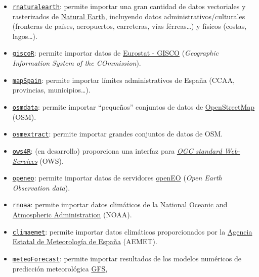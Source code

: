 \documentclass[
  spanish,
]{book}
\providecommand{\tightlist}{%
  \setlength{\itemsep}{0pt}\setlength{\parskip}{0pt}}
\theoremstyle{break}
\theoremstyle{definition}
\theoremstyle{definition}
\theoremstyle{definition}
\theoremstyle{definition}
\theoremstyle{remark}
\begin{document}
\begin{itemize}
\tightlist
\item
  \href{https://docs.ropensci.org/rnaturalearth/}{\texttt{rnaturalearth}}: permite importar una gran cantidad de datos vectoriales y rasterizados de \href{http://www.naturalearthdata.com}{Natural Earth}, incluyendo datos administrativos/culturales (fronteras de países, aeropuertos, carreteras, vías férreas\ldots) y físicos (costas, lagos\ldots).
\item
  \href{https://ropengov.github.io/giscoR/}{\texttt{giscoR}}: permite importar datos de \href{https://ec.europa.eu/eurostat/web/gisco}{Eurostat - GISCO} (\emph{Geographic Information System of the COmmission}).
\item
  \href{https://ropenspain.github.io/mapSpain}{\texttt{mapSpain}}: permite importar límites administrativos de España (CCAA, provincias, municipios\ldots).
\item
  \href{https://CRAN.R-project.org/package=osmdata}{\texttt{osmdata}}: permite importar ``pequeños'' conjuntos de datos de \href{https://www.openstreetmap.org}{OpenStreetMap} (OSM).
\item
  \href{https://CRAN.R-project.org/package=osmextract}{\texttt{osmextract}}: permite importar grandes conjuntos de datos de OSM.
\item
  \href{https://github.com/eblondel/ows4R/wiki}{\texttt{ows4R}}: (en desarrollo) proporciona una interfaz para \emph{\href{https://www.ogc.org/docs/is}{OGC standard Web-Services}} (OWS).
\item
  \href{https://open-eo.github.io/openeo-r-client}{\texttt{openeo}}: permite importar datos de servidores \href{https://openeo.org}{openEO} (\emph{Open Earth Observation data}).
\item
  \href{https://CRAN.R-project.org/package=rnoaa}{\texttt{rnoaa}}: permite importar datos climáticos de la \href{https://www.ncdc.noaa.gov/cdo-web/webservices/v2}{National Oceanic and Atmospheric Administration} (NOAA).
\item
  \href{https://ropenspain.github.io/climaemet}{\texttt{climaemet}}: permite importar datos climáticos proporcionados por la \href{https://opendata.aemet.es}{Agencia Estatal de Meteorología de España} (AEMET).
\item
  \href{https://github.com/oscarperpinan/meteoForecast}{\texttt{meteoForecast}}: permite importar resultados de los modelos numéricos de predicción meteorológica \href{https://www.ncdc.noaa.gov/data-access/model-data/model-datasets/global-forcast-system-gfs}{GFS},

\end{itemize}
\end{document}
